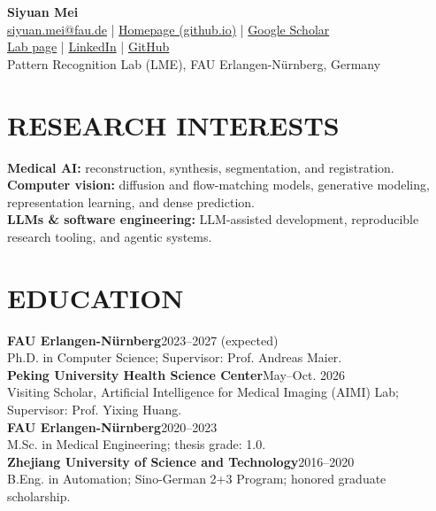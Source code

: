 \documentclass[10pt,a4paper]{article}
\newcommand{\entry}[3]{\textbf{#1}\hfill #2\\[-1pt]#3}
\begin{document}
\begin{center}
    {\fontsize{30}{34}\selectfont\bfseries Siyuan Mei}\\[6pt]
    \href{mailto:siyuan.mei@fau.de}{siyuan.mei@fau.de}
    \enspace | \enspace \href{https://siyuan-mei.github.io}{Homepage (github.io)}
    \enspace | \enspace \href{https://scholar.google.com/citations?user=W_xPF2YAAAAJ\&hl=en}{Google Scholar}\\[3pt]
    \href{https://lme.tf.fau.de/persons/siyuan-mei/}{Lab page}
    \enspace | \enspace \href{https://www.linkedin.com/in/siyuan-mei-409353247/}{LinkedIn}
    \enspace | \enspace \href{https://github.com/siyuan-mei}{GitHub}\\[4pt]
    Pattern Recognition Lab (LME), FAU Erlangen-Nürnberg, Germany
\end{center}

\section{RESEARCH INTERESTS}
\textbf{Medical AI:} reconstruction, synthesis, segmentation, and registration.\\
\textbf{Computer vision:} diffusion and flow-matching models, generative modeling, representation learning, and dense prediction.\\
\textbf{LLMs \& software engineering:} LLM-assisted development, reproducible research tooling, and agentic systems.

\section{EDUCATION}
\entry{FAU Erlangen-Nürnberg}{2023--2027 (expected)}{Ph.D. in Computer Science; Supervisor: Prof. Andreas Maier.}\\[4pt]
\entry{Peking University Health Science Center}{May--Oct. 2026}{Visiting Scholar, Artificial Intelligence for Medical Imaging (AIMI) Lab; Supervisor: Prof. Yixing Huang.}\\[4pt]
\entry{FAU Erlangen-Nürnberg}{2020--2023}{M.Sc. in Medical Engineering; thesis grade: 1.0.}\\[4pt]
\entry{Zhejiang University of Science and Technology}{2016--2020}{B.Eng. in Automation; Sino-German 2+3 Program; honored graduate scholarship.}
\end{document}
